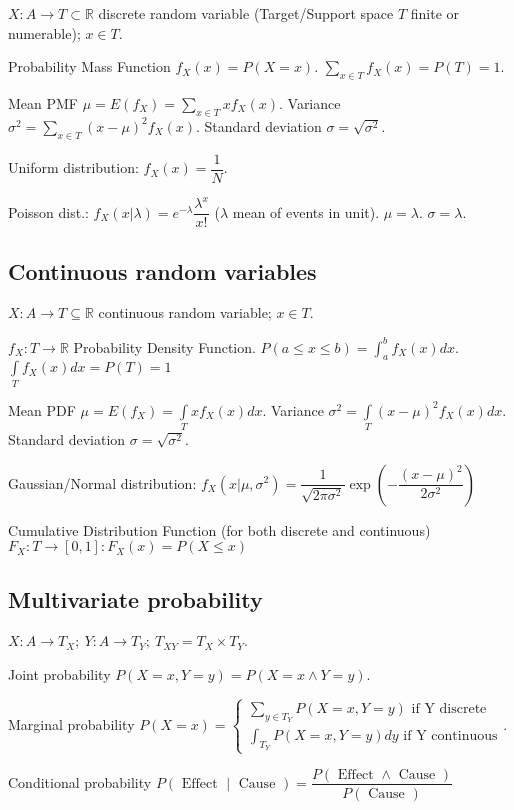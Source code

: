 \documentclass[]{article}
\begin{document}
	$X:A\to T\subset\mathbb{R}$ discrete random variable (Target/Support space $T$ finite or numerable); $x\in T$.
	
	Probability Mass Function $f_X(x) = P(X=x)$.
	$\sum\limits_{x \in T} f_X(x) = P(T) = 1$.
	
	Mean PMF $\mu=E(f_X)=\sum\limits_{x \in T}x f_X(x)$.
	Variance $\sigma^2 = \sum\limits_{x \in T} (x-\mu)^2 f_X(x)$.
	Standard deviation $\sigma=\sqrt{\sigma^2}$.
	
	Uniform distribution: $f_X(x)=\dfrac{1}{N}$.
	
	Poisson dist.: $f_X(x|\lambda)=e^{-\lambda}\dfrac{\lambda^x}{x!}$ ($\lambda$ mean of events in unit).
	$\mu=\lambda$. $\sigma=\lambda$.
	
	\subsection{Continuous random variables}
	
	$X:A\to T\subseteq\mathbb{R}$ continuous random variable; $x\in T$.
	
	$f_X:T\to\mathbb{R}$ Probability Density Function.
	$P(a\le x\le b) = \int_{a}^{b}f_X(x)dx$.
	$\int\limits_T f_X(x) dx = P(T) = 1$
	
	Mean PDF $\mu = E(f_X) = \int\limits_T x f_X(x) dx$.
	Variance $\sigma^2 = \int\limits_T (x-\mu)^2 f_X(x)dx$.
	Standard deviation $\sigma=\sqrt{\sigma^2}$.
	
	Gaussian/Normal distribution: $f_X(x|\mu,\sigma^2)=\dfrac{1}{\sqrt{2\pi\sigma^2}}\exp\left(-\dfrac{(x-\mu)^2}{2\sigma^2}\right)$
	
	Cumulative Distribution Function (for both discrete and continuous) $F_X:T\to[0,1]: F_X(x) = P(X\le x)$
	
	\subsection{Multivariate probability}
	
	$X:A\to T_X; \ Y:A\to T_Y; \ T_{XY}=T_X \times T_Y$.
	
	Joint probability $P(X=x,Y=y) = P(X=x \land Y=y)$.
	
	Marginal probability $P(X=x)=\left\{\begin{matrix}
		\sum_{y\in T_Y} P(X=x,Y=y) \text{ if Y discrete}\\
		\int_{T_Y} P(X=x,Y=y) dy \text{ if Y continuous}
	\end{matrix}\right.$.
	
	Conditional probability $P(\text { Effect } \mid \text { Cause })=\dfrac{P(\text { Effect } \wedge \text { Cause })}{P(\text { Cause })}$
	
\end{document}

